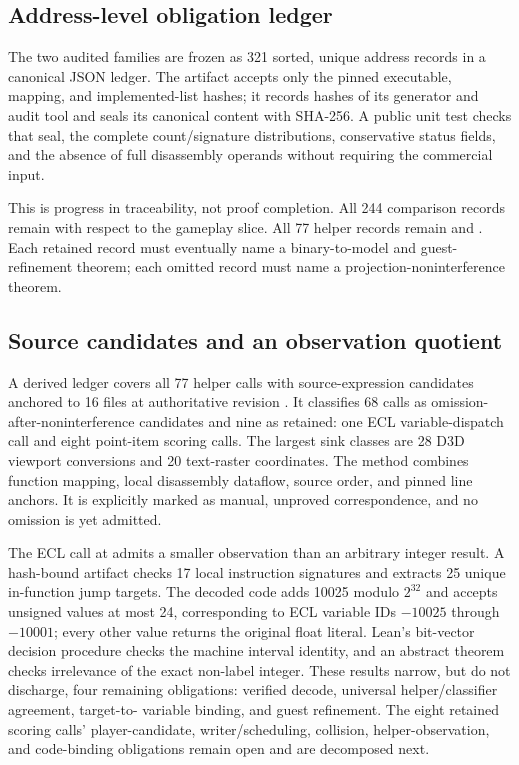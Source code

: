 \subsection{Address-level obligation ledger}

The two audited families are frozen as 321 sorted, unique address records in a
canonical JSON ledger.  The artifact accepts only the pinned executable,
mapping, and implemented-list hashes; it records hashes of its generator and
audit tool and seals its canonical content with SHA-256.  A public unit test
checks that seal, the complete count/signature distributions, conservative
status fields, and the absence of full disassembly operands without requiring
the commercial input.

This is progress in traceability, not proof completion.  All 244 comparison
records remain  with respect to the gameplay slice.  All 77
helper records remain  and
.  Each retained record must
eventually name a binary-to-model and guest-refinement theorem; each omitted
record must name a projection-noninterference theorem.

\subsection{Source candidates and an observation quotient}

A derived ledger covers all 77 helper calls with source-expression candidates
anchored to 16 files at authoritative revision
.  It classifies 68 calls as
omission-after-noninterference candidates and nine as retained: one ECL
variable-dispatch call and eight point-item scoring calls.  The largest sink
classes are 28 D3D viewport conversions and 20 text-raster coordinates.  The
method combines function mapping, local disassembly dataflow, source order,
and pinned line anchors.  It is explicitly marked as manual, unproved
correspondence, and no omission is yet admitted.

The ECL call at  admits a smaller observation than an arbitrary
integer result.  A hash-bound artifact checks 17 local instruction signatures
and extracts 25 unique in-function jump targets.  The decoded code adds 10025
modulo $2^{32}$ and accepts unsigned values at most 24, corresponding to ECL
variable IDs $-10025$ through $-10001$; every other value returns the original
float literal.  Lean's bit-vector decision procedure checks the machine
interval identity, and an abstract theorem checks irrelevance of the exact
non-label integer.  These results narrow, but do not discharge, four remaining
obligations: verified decode, universal helper/classifier agreement, target-to-
variable binding, and guest refinement.  The eight retained scoring calls'
player-candidate, writer/scheduling, collision, helper-observation, and
code-binding obligations remain open and are decomposed next.

